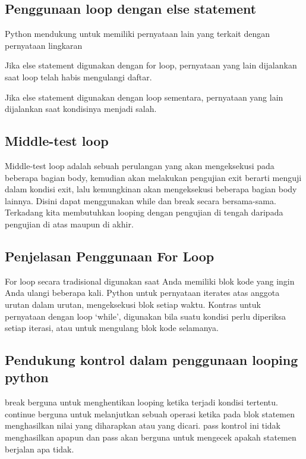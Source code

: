 \subsection{Penggunaan loop dengan else statement}
Python mendukung untuk memiliki pernyataan lain yang terkait dengan pernyataan lingkaran

Jika else statement digunakan dengan for loop, pernyataan yang lain dijalankan saat loop telah habis mengulangi daftar.

Jika else statement digunakan dengan loop sementara, pernyataan yang lain dijalankan saat kondisinya menjadi salah.

\subsection{Middle-test loop}
Middle-test loop adalah sebuah perulangan yang akan mengeksekusi pada beberapa bagian body, kemudian akan melakukan pengujian exit berarti menguji dalam kondisi exit, lalu kemungkinan akan mengeksekusi beberapa bagian body lainnya. Disini dapat menggunakan while dan break secara bersama-sama. Terkadang kita membutuhkan looping dengan pengujian di tengah daripada pengujian di atas maupun di akhir.

\subsection{Penjelasan Penggunaan For Loop}
For loop secara tradisional digunakan saat Anda memiliki blok kode yang ingin Anda ulangi beberapa kali. Python untuk pernyataan iterates atas anggota urutan dalam urutan, mengeksekusi blok setiap waktu. Kontras untuk pernyataan dengan loop `while', digunakan bila suatu kondisi perlu diperiksa setiap iterasi, atau untuk mengulang blok kode selamanya.

\subsection{Pendukung kontrol dalam penggunaan looping python}
break berguna untuk menghentikan looping ketika terjadi kondisi tertentu.
continue berguna untuk melanjutkan sebuah operasi ketika pada blok statemen menghasilkan nilai yang diharapkan atau yang dicari.
pass kontrol ini tidak menghasilkan apapun dan pass akan berguna untuk mengecek apakah statemen berjalan apa tidak.
